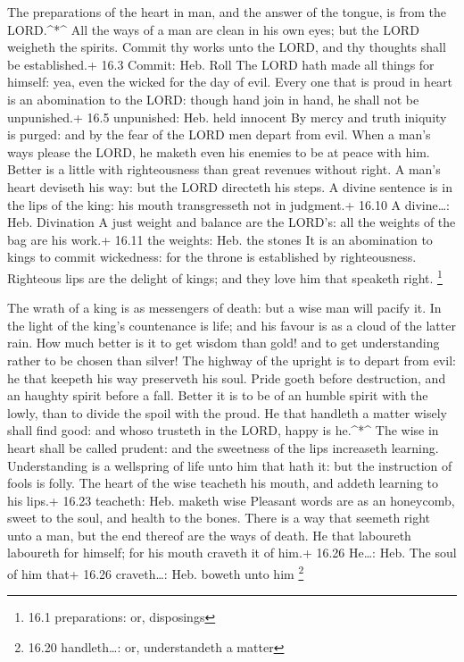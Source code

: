  The preparations of the heart in man, and the answer of the
tongue, is from the LORD.\^{}*\^{}  All the ways of a man
are clean in his own eyes; but the LORD weigheth the spirits.
 Commit thy works unto the LORD, and thy thoughts shall be
established.+ 16.3 Commit: Heb. Roll  The LORD hath made all
things for himself: yea, even the wicked for the day of evil.
 Every one that is proud in heart is an abomination to the
LORD: though hand join in hand, he shall not be unpunished.+ 16.5
unpunished: Heb. held innocent  By mercy and truth iniquity
is purged: and by the fear of the LORD men depart from evil.
 When a man's ways please the LORD, he maketh even his
enemies to be at peace with him.  Better is a little with
righteousness than great revenues without right.  A man's
heart deviseth his way: but the LORD directeth his steps. 
A divine sentence is in the lips of the king: his mouth transgresseth
not in judgment.+ 16.10 A divine\ldots: Heb. Divination  A
just weight and balance are the LORD's: all the weights of the bag are
his work.+ 16.11 the weights: Heb. the stones  It is an
abomination to kings to commit wickedness: for the throne is established
by righteousness.  Righteous lips are the delight of kings;
and they love him that speaketh right. \footnote{16.1 preparations: or,
  disposings}

 The wrath of a king is as messengers of death: but a wise
man will pacify it.  In the light of the king's countenance
is life; and his favour is as a cloud of the latter rain. 
How much better is it to get wisdom than gold! and to get understanding
rather to be chosen than silver!  The highway of the
upright is to depart from evil: he that keepeth his way preserveth his
soul.  Pride goeth before destruction, and an haughty
spirit before a fall.  Better it is to be of an humble
spirit with the lowly, than to divide the spoil with the proud.
 He that handleth a matter wisely shall find good: and
whoso trusteth in the LORD, happy is he.\^{}*\^{}  The wise
in heart shall be called prudent: and the sweetness of the lips
increaseth learning.  Understanding is a wellspring of life
unto him that hath it: but the instruction of fools is folly.
 The heart of the wise teacheth his mouth, and addeth
learning to his lips.+ 16.23 teacheth: Heb. maketh wise 
Pleasant words are as an honeycomb, sweet to the soul, and health to the
bones.  There is a way that seemeth right unto a man, but
the end thereof are the ways of death.  He that laboureth
laboureth for himself; for his mouth craveth it of him.+ 16.26 He\ldots:
Heb. The soul of him that+ 16.26 craveth\ldots: Heb. boweth unto him
\footnote{16.20 handleth\ldots: or, understandeth a matter}

